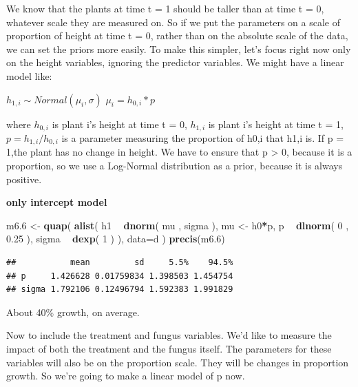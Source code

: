 \documentclass[
]{article}
\newenvironment{Shaded}{\begin{snugshade}}{\end{snugshade}}
\newcommand{\DataTypeTok}[1]{\textcolor[rgb]{0.13,0.29,0.53}{#1}}
\newcommand{\DecValTok}[1]{\textcolor[rgb]{0.00,0.00,0.81}{#1}}
\newcommand{\FloatTok}[1]{\textcolor[rgb]{0.00,0.00,0.81}{#1}}
\newcommand{\KeywordTok}[1]{\textcolor[rgb]{0.13,0.29,0.53}{\textbf{#1}}}
\newcommand{\NormalTok}[1]{#1}
\newcommand{\OperatorTok}[1]{\textcolor[rgb]{0.81,0.36,0.00}{\textbf{#1}}}
\newcommand{\StringTok}[1]{\textcolor[rgb]{0.31,0.60,0.02}{#1}}
\begin{document}
We know that the plants at time t = 1 should be taller than at time t =
0, whatever scale they are measured on. So if we put the parameters on a
scale of proportion of height at time t = 0, rather than on the absolute
scale of the data, we can set the priors more easily. To make this
simpler, let's focus right now only on the height variables, ignoring
the predictor variables. We might have a linear model like:

\(h_{1,i} \sim Normal(\mu_i, \sigma)\) \(\mu_i= h_{0,i}*p\)

where \(h_{0,i}\) is plant i's height at time t = 0, \(h_{1,i}\) is
plant i's height at time t = 1, \(p= h_{1,i}/h_{0,i}\) is a parameter
measuring the proportion of h0,i that h1,i is. If p = 1,the plant has no
change in height. We have to ensure that p \textgreater{} 0, because it
is a proportion, so we use a Log-Normal distribution as a prior, because
it is always positive.

\textbf{only intercept model }

\begin{Shaded}
\begin{Highlighting}[]
\NormalTok{m6}\FloatTok{.6}\NormalTok{ <-}\StringTok{ }\KeywordTok{quap}\NormalTok{( }\KeywordTok{alist}\NormalTok{(}
\NormalTok{h1 }\OperatorTok{~}\StringTok{ }\KeywordTok{dnorm}\NormalTok{( mu , sigma ), }
\NormalTok{mu <-}\StringTok{ }\NormalTok{h0}\OperatorTok{*}\NormalTok{p,}
\NormalTok{p }\OperatorTok{~}\StringTok{ }\KeywordTok{dlnorm}\NormalTok{( }\DecValTok{0}\NormalTok{ , }\FloatTok{0.25}\NormalTok{ ), }
\NormalTok{sigma }\OperatorTok{~}\StringTok{ }\KeywordTok{dexp}\NormalTok{( }\DecValTok{1}\NormalTok{ )}
\NormalTok{), }\DataTypeTok{data=}\NormalTok{d ) }
\KeywordTok{precis}\NormalTok{(m6}\FloatTok{.6}\NormalTok{)}
\end{Highlighting}
\end{Shaded}

\begin{verbatim}
##           mean         sd     5.5%    94.5%
## p     1.426628 0.01759834 1.398503 1.454754
## sigma 1.792106 0.12496794 1.592383 1.991829
\end{verbatim}

About 40\% growth, on average.

Now to include the treatment and fungus variables. We'd like to measure
the impact of both the treatment and the fungus itself. The parameters
for these variables will also be on the proportion scale. They will be
changes in proportion growth. So we're going to make a linear model of p
now.
\end{document}
